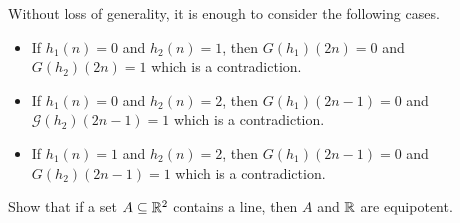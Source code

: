\begin{chapterendexercises}
\begin{solution}
\begin{enumerate}
            Without loss of generality, it is enough to consider the following
            cases.
            \begin{itemize}
              \item If $h_1(n) = 0$ and $h_2(n) = 1$, then $G(h_1)(2n) = 0$
                and $G(h_2)(2n) = 1$ which is a contradiction.
              \item If $h_1(n) = 0$ and $h_2(n) = 2$, then
                $G(h_1)(2n - 1) = 0$ and $\mathcal{G}(h_2)(2n - 1) = 1$ which
                is a contradiction.
              \item If $h_1(n) = 1$ and $h_2(n) = 2$, then $G(h_1)(2n - 1) =
              0$ and $G(h_2)(2n - 1) = 1$ which is a contradiction.
            \end{itemize}
        \end{enumerate}
      \end{solution}
    \exercise Show that if a set $A \subseteq {\mathbb{R}}^2$ contains a line, then $A$
      and ${\mathbb{R}}$ are equipotent.
\end{chapterendexercises}
